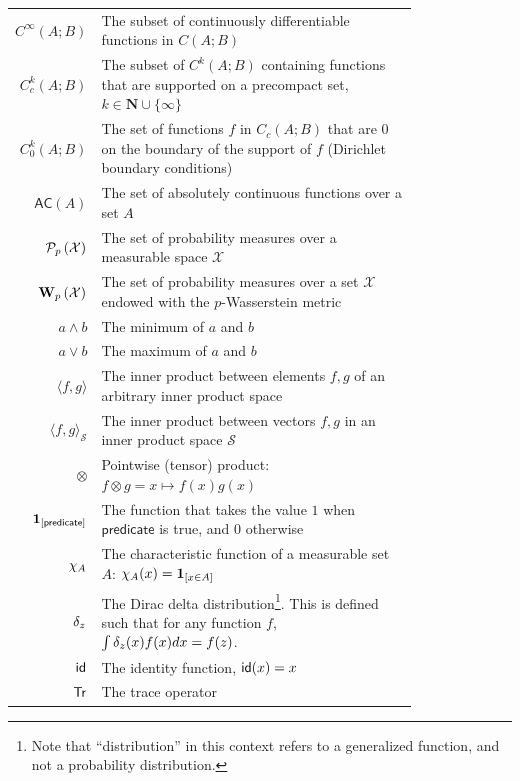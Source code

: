 {\begin{longtable}[h]{|r p{0.8\linewidth}|}
  $C^\infty(A;B)$ & The subset of continuously differentiable functions
                  in $C(A;B)$\\
  $C_c^k(A;B)$ & The subset of $C^k(A;B)$ containing functions that are
               supported on a precompact set, $k\in\mathbf{N}\cup\{\infty\}$\\
  $C_0^k(A;B)$ & The set of functions $f$ in $C_c(A;B)$ that are $0$ on
  the boundary of the support of $f$ (Dirichlet boundary conditions)\\
  $\mathsf{AC}(A)$ & The set of absolutely continuous functions over a
                     set $A$\\
  $\probset{\mathcal{X}}$ & The set of probability measures over a
  measurable space $\mathcal{X}$\\
  $\wassersteinspace[p]{\mathcal{X}}$ & The set of probability
  measures over a set $\mathcal{X}$ endowed with the $p$-Wasserstein metric\\
  $a\land b$ & The minimum of $a$ and $b$\\
  $a\lor b$ & The maximum of $a$ and $b$\\
  $\langle f, g\rangle$ & The inner product between elements
                          $f,g$ of an arbitrary inner product space\\
  $\langle f, g\rangle_{\mathcal{S}}$ & The inner product between vectors $f, g$
                              in an inner product space
                                        $\mathcal{S}$\\
  $\otimes$ & Pointwise (tensor) product: $f\otimes g = x\mapsto f(x)g(x)$\\
  $\indicator{\mathsf{predicate}}$ & The function that takes the value
                                     $1$ when $\mathsf{predicate}$ is
                                     true, and $0$ otherwise\\
  $\characteristic{A}$ & The characteristic function of a measurable
                         set $A$: $\chi_A(x) = \indicator{x\in A}$\\
  $\dirac{z}$ & The Dirac delta distribution\footnote{Note that
                ``distribution'' in this context refers to a
                generalized function, and not a probability
                distribution.}. This is defined such that for any
                function $f$, $\int \dirac{z}(x)f(x)dx = f(z)$.\\
  $\identity$ & The identity function, $\identity(x) = x$\\
  $\trace$ & The trace operator\\

\end{longtable}}
